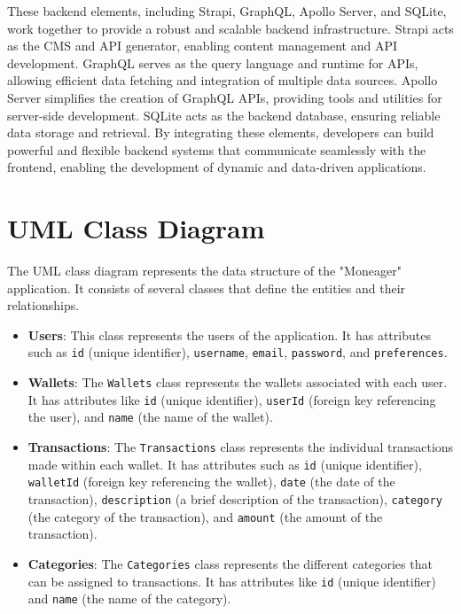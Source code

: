 These backend elements, including Strapi, GraphQL, Apollo Server, and SQLite, work together to provide a robust and scalable backend infrastructure. Strapi acts as the CMS and API generator, enabling content management and API development. GraphQL serves as the query language and runtime for APIs, allowing efficient data fetching and integration of multiple data sources. Apollo Server simplifies the creation of GraphQL APIs, providing tools and utilities for server-side development. SQLite acts as the backend database, ensuring reliable data storage and retrieval. By integrating these elements, developers can build powerful and flexible backend systems that communicate seamlessly with the frontend, enabling the development of dynamic and data-driven applications.

\section{UML Class Diagram}
\label{sec:class-diagram}


The UML class diagram represents the data structure of the "Moneager" application. It consists of several classes that define the entities and their relationships.

\begin{itemize}
  \item \textbf{Users}: This class represents the users of the application. It has attributes such as \texttt{id} (unique identifier), \texttt{username}, \texttt{email}, \texttt{password}, and \texttt{preferences}.

  \item \textbf{Wallets}: The \texttt{Wallets} class represents the wallets associated with each user. It has attributes like \texttt{id} (unique identifier), \texttt{userId} (foreign key referencing the user), and \texttt{name} (the name of the wallet).

  \item \textbf{Transactions}: The \texttt{Transactions} class represents the individual transactions made within each wallet. It has attributes such as \texttt{id} (unique identifier), \texttt{walletId} (foreign key referencing the wallet), \texttt{date} (the date of the transaction), \texttt{description} (a brief description of the transaction), \texttt{category} (the category of the transaction), and \texttt{amount} (the amount of the transaction).

  \item \textbf{Categories}: The \texttt{Categories} class represents the different categories that can be assigned to transactions. It has attributes like \texttt{id} (unique identifier) and \texttt{name} (the name of the category).
\end{itemize}

